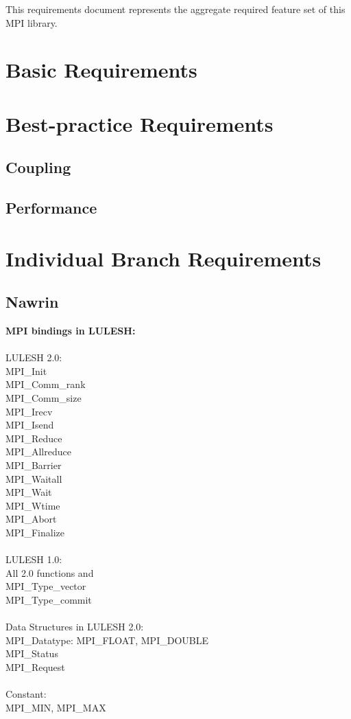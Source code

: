 \documentclass{article}
\begin{document}
This requirements document represents the aggregate required feature set of this MPI library.

\section{Basic Requirements}

\section{Best-practice Requirements}

\subsection{Coupling}

\subsection{Performance}

\section{Individual Branch Requirements}

\subsection{Nawrin}
\textbf{MPI bindings in LULESH:}\\\\
LULESH 2.0:\\
MPI\_Init\\
MPI\_Comm\_rank\\
MPI\_Comm\_size\\
MPI\_Irecv\\
MPI\_Isend\\
MPI\_Reduce\\
MPI\_Allreduce\\
MPI\_Barrier\\
MPI\_Waitall\\
MPI\_Wait\\
MPI\_Wtime\\
MPI\_Abort\\
MPI\_Finalize\\
\\
LULESH 1.0:\\
All 2.0 functions and \\
MPI\_Type\_vector\\
MPI\_Type\_commit\\
\\
Data Structures in LULESH 2.0:\\
MPI\_Datatype: MPI\_FLOAT, MPI\_DOUBLE\\
MPI\_Status\\
MPI\_Request\\
\\
Constant:\\
MPI\_MIN, MPI\_MAX\\
\\
\end{document}
